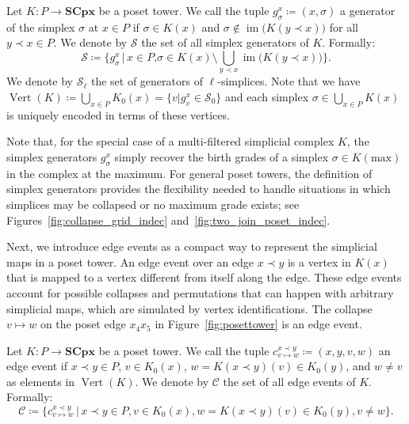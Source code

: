 \documentclass[english,a4paper,nolineno,cleveref]{socg-lipics-v2021}
\DeclareMathOperator{\im}{im}
\begin{document}
\begin{definition} \label{def:simplex_generators}
Let $K\colon P\rightarrow \mathbf{SCpx}$ be a poset tower. We call the tuple $g_\sigma^x\coloneqq (x,\sigma)$ a generator of the simplex $\sigma$ at $x\in P$ if $\sigma \in K(x)$ and $\sigma\notin \im \!\big(K(y\prec x)\big)$ for all $y\prec x\in P$. We denote by $\mathcal{S}$ the set of all simplex generators of $K$. Formally:
\begin{equation*}
\mathcal{S}\coloneqq\Big\{g_\sigma^x\,\vert\, x\in P\text{,}\sigma\in K(x)\setminus\bigcup_{y\prec x}\im \!\big(K(y\prec x)\big)\Big\}.
\end{equation*}
We denote by ${\mathcal S}_\ell$ the set of generators of $\ell$-simplices. Note that we have $\operatorname{Vert}(K)\coloneqq\bigcup_{x\in P}K_0(x)=\{v\vert g^x_v\in \mathcal{S}_0\}$ and each simplex $\sigma\in\bigcup_{x\in P}K(x)$ is uniquely encoded in terms of these vertices.
\end{definition}


Note that, for the special case of a multi-filtered simplicial complex $K$, the simplex generators $g^x_{\sigma}$ simply recover the birth grades of a simplex $\sigma\in K(\text{max})$ in the complex at the maximum. For general poset towers, the definition of simplex generators provides the flexibility needed to handle situations in which simplices may be collapsed or no maximum grade exists; see Figures~\ref{fig:collapse_grid_indec} and~\ref{fig:two_join_poset_indec}.

Next, we introduce edge events as a compact way to represent the simplicial maps in a poset tower. An edge event over an edge $x\prec y$ is a vertex in $K(x)$ that is mapped to a vertex different from itself along the edge. These edge events account for possible collapses and permutations that can happen with arbitrary simplicial maps, which are simulated by vertex identifications. The collapse $v\mapsto w$ on the poset edge $x_4x_5$ in Figure~\ref{fig:posettower} is an edge event.

\begin{definition} \label{def:edge_events}
Let $K\colon P\rightarrow \mathbf{SCpx}$ be a poset tower. We call the tuple $c_{v\mapsto w}^{x\prec y}\coloneqq(x,y,v,w)$ an edge event if $x\prec y\in P$, $v\in K_0(x)$, $w=K(x\prec y)(v)\in K_0(y)$, and $w\neq v$ as elements in $\operatorname{Vert}(K)$. We denote by $\mathcal{C}$ the set of all edge events of $K$. Formally:
\begin{equation*}
\mathcal{C}\coloneqq \Big\{c_{v\mapsto w}^{x\prec y}\,\vert\, x\prec y\in P, v\in K_0(x), w=K(x\prec y)(v)\in K_0(y), v\neq w\Big\} .
\end{equation*}
\end{definition}
\end{document}
